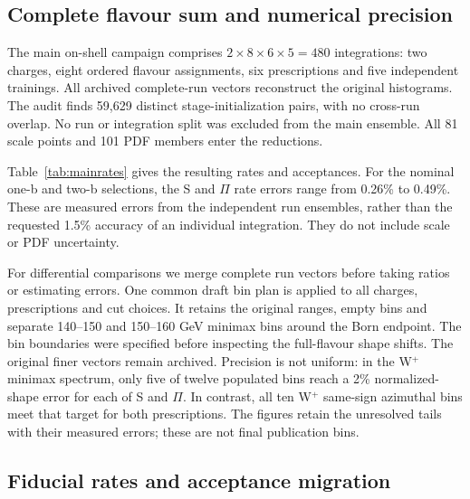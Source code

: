 \subsection{Complete flavour sum and numerical precision}

The main on-shell campaign comprises
$2\times8\times6\times5=480$ integrations: two charges, eight ordered
flavour assignments, six prescriptions and five independent trainings.
All archived complete-run vectors reconstruct the original histograms.
The audit finds 59,629 distinct stage-initialization pairs, with no
cross-run overlap. No run or integration split was excluded from the main
ensemble. All 81 scale points and 101 PDF members enter the reductions.

Table~\ref{tab:mainrates} gives the resulting rates and acceptances.
For the nominal one-b and two-b selections, the S and $\Pi$ rate errors
range from 0.26\% to 0.49\%. These are measured errors from the independent
run ensembles, rather than the requested 1.5\% accuracy of an individual
integration. They do not include scale or PDF uncertainty.

For differential comparisons we merge complete run vectors before taking
ratios or estimating errors. One common draft bin plan is applied to all
charges, prescriptions and cut choices. It retains the original ranges,
empty bins and separate 140--150 and 150--160 GeV minimax bins around the
Born endpoint. The bin boundaries were specified before inspecting the
full-flavour shape shifts. The original finer vectors remain archived.
Precision is not uniform: in the W$^+$ minimax spectrum, only five of
twelve populated bins reach a 2\% normalized-shape error for each of S
and $\Pi$. In contrast, all ten W$^+$ same-sign azimuthal bins meet that
target for both prescriptions. The figures retain the unresolved tails
with their measured errors; these are not final publication bins.



\subsection{Fiducial rates and acceptance migration}

